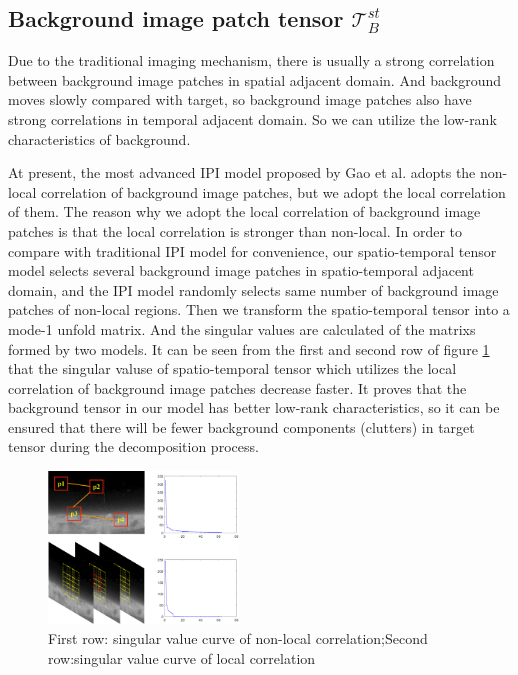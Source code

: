 \documentclass[journal]{IEEEtran}
\begin{document}
\subsection{Background image patch tensor $\mathbf{\mathcal T}_B^{st}$ }
Due to the traditional imaging mechanism, there is usually a strong correlation between background image patches in spatial adjacent domain. And background moves slowly compared with target, so background image patches also have strong correlations in temporal adjacent domain. So we can utilize the low-rank characteristics of background. 

At present, the most advanced IPI\cite{gao2013infrared} model proposed by Gao et al. adopts the non-local correlation of background image patches, but we adopt the local correlation of them. The reason why we adopt the local correlation of background image patches is that the local correlation is stronger than non-local. In order to compare with traditional IPI model for convenience, our spatio-temporal tensor model selects several background image patches in spatio-temporal adjacent domain, and the IPI model randomly selects same number of background image patches of non-local regions. Then we transform the spatio-temporal tensor into a mode-1 unfold matrix. And the singular values are calculated of the matrixs formed by two models. It can be seen from the first and second row of figure \ref{singular} that the singular valuse of spatio-temporal tensor which utilizes the local correlation of background image patches decrease faster. It proves that the background tensor in our model has better low-rank characteristics, so it can be ensured that there will be fewer background components (clutters) in target tensor during the decomposition process.

\begin{figure}[H]
  \centering
  \includegraphics[width=0.45\textwidth]{singular.eps}
  \caption{First row: singular value curve of non-local correlation;Second row:singular value curve of local correlation}
  \label{singular}
\end{figure}
\end{document}
